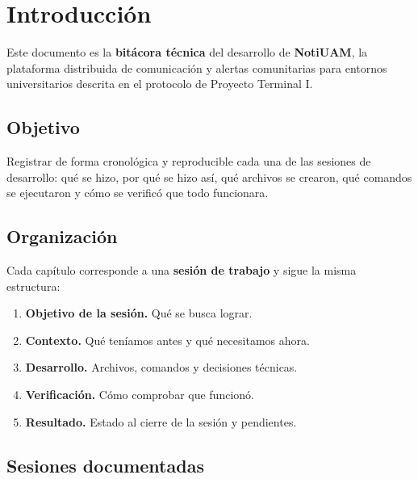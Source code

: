 \chapter{Introducción}

Este documento es la \textbf{bitácora técnica} del desarrollo de \textbf{NotiUAM}, la plataforma distribuida de comunicación y alertas comunitarias para entornos universitarios descrita en el protocolo de Proyecto Terminal I.

\section{Objetivo}

Registrar de forma cronológica y reproducible cada una de las sesiones de desarrollo: qué se hizo, por qué se hizo así, qué archivos se crearon, qué comandos se ejecutaron y cómo se verificó que todo funcionara.

\section{Organización}

Cada capítulo corresponde a una \textbf{sesión de trabajo} y sigue la misma estructura:

\begin{enumerate}[leftmargin=*]
  \item \textbf{Objetivo de la sesión.} Qué se busca lograr.
  \item \textbf{Contexto.} Qué teníamos antes y qué necesitamos ahora.
  \item \textbf{Desarrollo.} Archivos, comandos y decisiones técnicas.
  \item \textbf{Verificación.} Cómo comprobar que funcionó.
  \item \textbf{Resultado.} Estado al cierre de la sesión y pendientes.
\end{enumerate}

\section{Sesiones documentadas}

